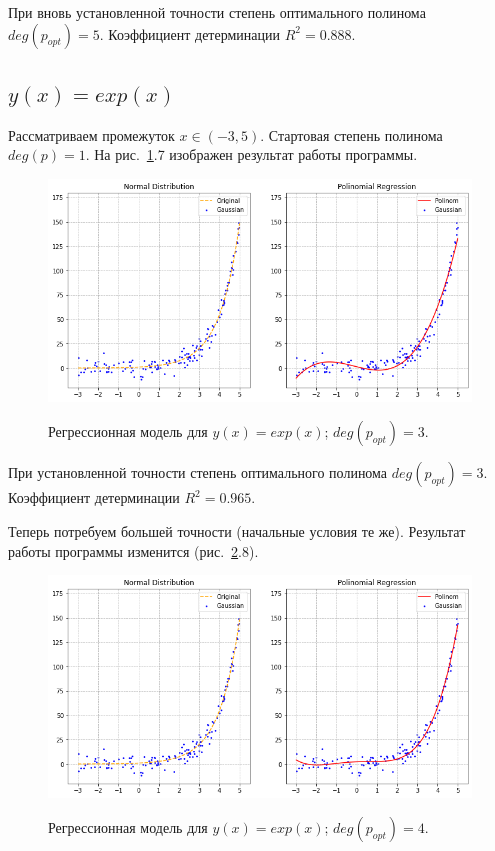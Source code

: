 \documentclass[12pt, a4paper]{article}
\begin{document}
    При вновь установленной точности степень оптимального полинома 
    $deg(p_{opt}) = 5$. Коэффициент детерминации $R^{2} = 0.888$.
    
    \subsection{$y(x) = exp(x)$}
    
    Рассматриваем промежуток $x \in (-3, 5)$. Стартовая степень полинома 
    $deg(p) = 1$. На рис.~\ref{image47}.7 изображен результат работы 
    программы.
    
    \begin{figure}[h!]
        \center
        \includegraphics[width = 14cm]{f5_1.png}
        \label{image47}
        \caption{Регрессионная модель для $y(x) = exp(x)$; $deg(p_{opt}) = 
            3$.}
    \end{figure}
    
    При установленной точности степень оптимального полинома $deg(p_{opt}) = 
    3$. Коэффициент детерминации $R^{2} = 0.965$.
    
    Теперь потребуем большей точности (начальные условия те же). Результат 
    работы программы изменится (рис.~\ref{image48}.8).
    
    \begin{figure}[h!]
        \center
        \includegraphics[width = 14cm]{f5_2.png}
        \label{image48}
        \caption{Регрессионная модель для $y(x) = exp(x)$; $deg(p_{opt}) = 
            4$.}
    \end{figure}
    
\end{document}
